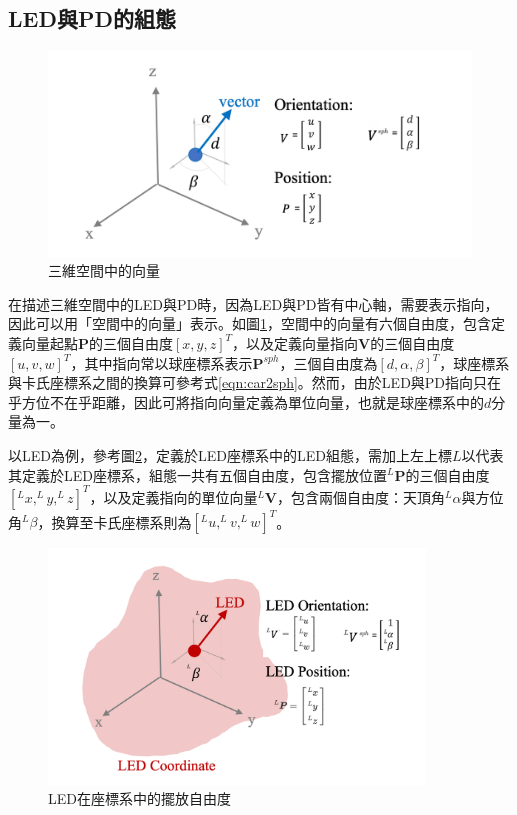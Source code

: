         \subsection{LED與PD的組態}
        \label{chp:config}


        \begin{figure}[ht]
            \centering
            \includegraphics[width=12cm]{ch2pic/vec_config.png}
            \caption{三維空間中的向量}
            \label{pic:vec_config}
        \end{figure}

        
        在描述三維空間中的LED與PD時，因為LED與PD皆有中心軸，需要表示指向，因此可以用「空間中的向量」表示。如圖\ref{pic:vec_config}，空間中的向量有六個自由度，包含定義向量起點$\boldsymbol{P}$的三個自由度$[x,y,z]^T$，以及定義向量指向$\boldsymbol{V}$的三個自由度$[u,v,w]^T$，其中指向常以球座標系表示$\boldsymbol{P}^{sph}$，三個自由度為$[d,\alpha,\beta]^T$，球座標系與卡氏座標系之間的換算可參考式\ref{eqn:car2sph}。然而，由於LED與PD指向只在乎方位不在乎距離，因此可將指向向量定義為單位向量，也就是球座標系中的$d$分量為一。
        
        以LED為例，參考圖\ref{pic:led_config}，定義於LED座標系中的LED組態，需加上左上標$L$以代表其定義於LED座標系，組態一共有五個自由度，包含擺放位置$^L \boldsymbol{P}$的三個自由度$[^Lx,^Ly,^Lz]^T$，以及定義指向的單位向量$^L\boldsymbol{V}$，包含兩個自由度：天頂角$^L\alpha$與方位角$^L\beta$，換算至卡氏座標系則為$[^Lu,^Lv,^Lw]^T$。

        \begin{figure}[ht]
            \centering
            \includegraphics[width=10cm]{ch2pic/LED_config.png}
            \caption{LED在座標系中的擺放自由度}
            \label{pic:led_config}
        \end{figure}


